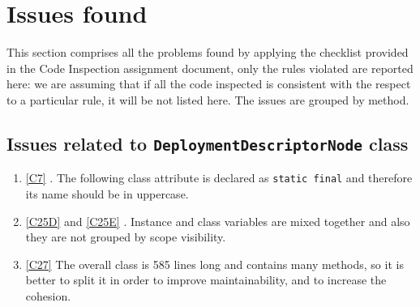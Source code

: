 \newpage
\section{Issues found}
\label{sec:issues}
This section comprises all the problems found by applying the checklist provided in the Code Inspection assignment document, only the rules violated are reported here: we are assuming that if all the code inspected is consistent with the respect to a particular rule, it will be not listed here.
The issues are grouped by method.
\subsection{Issues related to \texttt{DeploymentDescriptorNode} class}
\begin{enumerate}
	\item \ref{C7} . The following class attribute is declared as \texttt{static final} and therefore its name should be in uppercase. 
	\item \ref{C25D}  and \ref {C25E} . Instance and class variables are mixed together and also they are not grouped by scope visibility. 
	\item \ref{C27} The overall class is 585 lines long and contains many methods, so it is better to split it in order to improve maintainability, and to increase the cohesion.
\end{enumerate}


